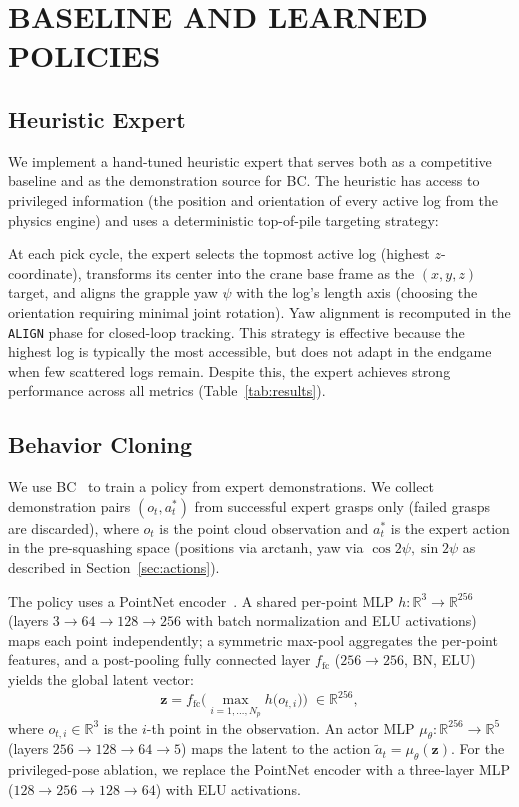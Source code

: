 \documentclass[letterpaper, 10 pt, conference]{ieeeconf}
\begin{document}
\section{BASELINE AND LEARNED POLICIES}

\subsection{Heuristic Expert}
\label{sec:expert}
We implement a hand-tuned heuristic expert that serves both as a competitive baseline and as the demonstration source for BC.
The heuristic has access to privileged information (the position and orientation of every active log from the physics engine) and uses a deterministic top-of-pile targeting strategy:

At each pick cycle, the expert selects the topmost active log (highest $z$-coordinate), transforms its center into the crane base frame as the $(x,y,z)$ target, and aligns the grapple yaw $\psi$ with the log's length axis (choosing the orientation requiring minimal joint rotation). Yaw alignment is recomputed in the \texttt{ALIGN} phase for closed-loop tracking.
This strategy is effective because the highest log is typically the most accessible, but does not adapt in the endgame when few scattered logs remain. Despite this, the expert achieves strong performance across all metrics (Table~\ref{tab:results}).

\subsection{Behavior Cloning}
\label{sec:bc}
We use BC~\cite{pomerleau1988alvinn} to train a policy from expert demonstrations.
We collect demonstration pairs $(o_t, a_t^*)$ from successful expert grasps only (failed grasps are discarded), where $o_t$ is the point cloud observation and $a_t^*$ is the expert action in the pre-squashing space (positions via $\mathrm{arctanh}$, yaw via $\cos 2\psi, \sin 2\psi$ as described in Section~\ref{sec:actions}).

The policy uses a PointNet encoder~\cite{qi2017pointnet}.
A shared per-point MLP $h: \mathbb{R}^3 \to \mathbb{R}^{256}$ (layers $3 \!\to\! 64 \!\to\! 128 \!\to\! 256$ with batch normalization and ELU activations) maps each point independently; a symmetric max-pool aggregates the per-point features, and a post-pooling fully connected layer $f_{\mathrm{fc}}$ ($256 \!\to\! 256$, BN, ELU) yields the global latent vector:
\begin{equation}
    \mathbf{z} = f_{\mathrm{fc}}\!\Big(\max_{i=1,\ldots,N_p} h\!\big(o_{t,i}\big)\Big) \;\in \mathbb{R}^{256},
\end{equation}
where $o_{t,i} \in \mathbb{R}^3$ is the $i$-th point in the observation.
An actor MLP $\mu_\theta: \mathbb{R}^{256} \to \mathbb{R}^{5}$ (layers $256 \!\to\! 128 \!\to\! 64 \!\to\! 5$) maps the latent to the action $\tilde{a}_t = \mu_\theta(\mathbf{z})$.
For the privileged-pose ablation, we replace the PointNet encoder with a three-layer MLP ($128 \!\to\! 256 \!\to\! 128 \!\to\! 64$) with ELU activations.
\end{document}
